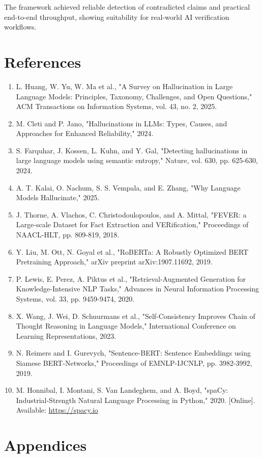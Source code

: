\documentclass[12pt,a4paper]{report}
\begin{document}
The framework achieved reliable detection of contradicted claims and practical end-to-end throughput,
showing suitability for real-world AI verification workflows.

\chapter{References}
\begin{enumerate}[leftmargin=1.5em]
\item L. Huang, W. Yu, W. Ma et al., "A Survey on Hallucination in Large Language Models: Principles, Taxonomy, Challenges, and Open Questions," ACM Transactions on Information Systems, vol. 43, no. 2, 2025.
\item M. Cleti and P. Jano, "Hallucinations in LLMs: Types, Causes, and Approaches for Enhanced Reliability," 2024.
\item S. Farquhar, J. Kossen, L. Kuhn, and Y. Gal, "Detecting hallucinations in large language models using semantic entropy," Nature, vol. 630, pp. 625-630, 2024.
\item A. T. Kalai, O. Nachum, S. S. Vempala, and E. Zhang, "Why Language Models Hallucinate," 2025.
\item J. Thorne, A. Vlachos, C. Christodoulopoulos, and A. Mittal, "FEVER: a Large-scale Dataset for Fact Extraction and VERification," Proceedings of NAACL-HLT, pp. 809-819, 2018.
\item Y. Liu, M. Ott, N. Goyal et al., "RoBERTa: A Robustly Optimized BERT Pretraining Approach," arXiv preprint arXiv:1907.11692, 2019.
\item P. Lewis, E. Perez, A. Piktus et al., "Retrieval-Augmented Generation for Knowledge-Intensive NLP Tasks," Advances in Neural Information Processing Systems, vol. 33, pp. 9459-9474, 2020.
\item X. Wang, J. Wei, D. Schuurmans et al., "Self-Consistency Improves Chain of Thought Reasoning in Language Models," International Conference on Learning Representations, 2023.
\item N. Reimers and I. Gurevych, "Sentence-BERT: Sentence Embeddings using Siamese BERT-Networks," Proceedings of EMNLP-IJCNLP, pp. 3982-3992, 2019.
\item M. Honnibal, I. Montani, S. Van Landeghem, and A. Boyd, "spaCy: Industrial-Strength Natural Language Processing in Python," 2020. [Online]. Available: \url{https://spacy.io}
\end{enumerate}

\chapter{Appendices}
\end{document}
